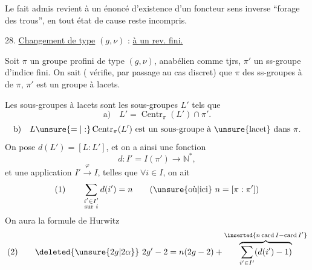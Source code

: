 Le fait admis revient à un énoncé d'existence d'un foncteur  sens inverse ``forage des trous'',  en tout état de cause reste incompris.



28. \uline{Changement de type} $(g,\nu)$  : \uline{ à un rev. fini.}

Soit $\pi$ un groupe profini  de type $(g,\nu)$, anabélien comme tjrs, $\pi'$ un ss-groupe d'indice fini. On sait ( vérifie, par passage au cas discret) que     $\pi$ des ss-groupes à  de $\pi$, $\pi'$ est un groupe à lacets.


Les sous-groupes à lacets sont  les  sous-groupes $L'$ tels que
\[
\text{a)}\quad L'=\operatorname{Centr}_{\pi}(L')\cap\pi'.
\]
\[
\text{b)}\quad L\unsure{=|:}\operatorname{Centr}_{\pi}(L')\text{ est un sous-groupe à \unsure{lacet} dans }\pi.
\]
On pose $d(L')=[L:L']$, et on a ainsi une fonction
\[
d:I'=I(\pi')\longrightarrow\mathbb N^*,
\]
et une application $I'\xrightarrow{\varphi}I$, telles que $\forall i\in I$, on ait
\[
\text{(1)}\qquad \sum_{\substack{i'\in I'\\\text{sur }i}}d(i')=n
\qquad (\text{\unsure{où|ici}}\ n=[\pi:\pi'])
\]
On aura la formule de Hurwitz
\[
\text{(2)}\qquad \deleted{\unsure{2g|2\alpha}}\ 2g'-2=n(2g-2)+\overbrace{\sum_{i'\in I'}(d(i')-1)}^{\inserted{n\operatorname{card}I-\operatorname{card}I'}}
\]
